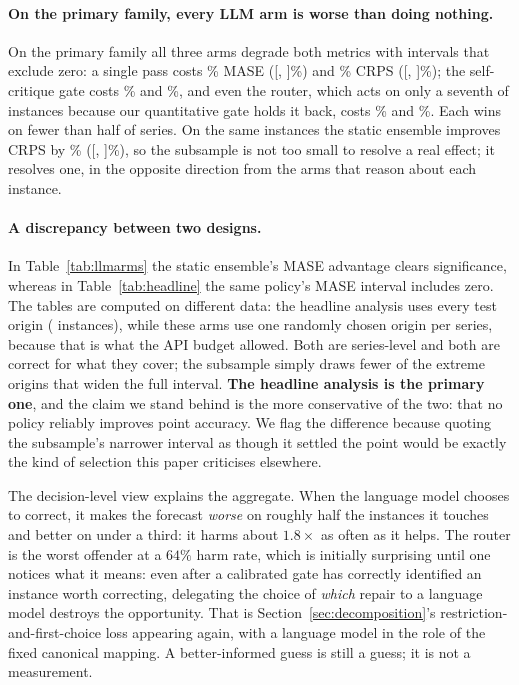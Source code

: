 \paragraph{On the primary family, every LLM arm is worse than doing nothing.}
On the primary family all
three arms degrade both metrics with intervals that exclude zero: a single pass costs
\llmMaseLlmSinglePct\% MASE ([\llmMaseLlmSingleCIlo, \llmMaseLlmSingleCIhi]\%) and
\llmCrpsLlmSinglePct\% CRPS ([\llmCrpsLlmSingleCIlo, \llmCrpsLlmSingleCIhi]\%); the
self-critique gate costs \llmMaseLlmCritiqueGatePct\% and
\llmCrpsLlmCritiqueGatePct\%, and even the router, which acts on only a seventh of
instances because our quantitative gate holds it back, costs
\llmMaseRgcLlmRouterPct\% and \llmCrpsRgcLlmRouterPct\%. Each wins on fewer than half of
series. On the same instances the static ensemble improves CRPS by
\llmCrpsAlwaysEnsembleAbs\% ([\llmCrpsAlwaysEnsembleAbsCIlo,
\llmCrpsAlwaysEnsembleAbsCIhi]\%), so the subsample is not too small to resolve a real
effect; it resolves one, in the opposite direction from the arms that reason about each
instance.

\paragraph{A discrepancy between two designs.}
In Table~\ref{tab:llmarms} the static ensemble's MASE advantage clears significance,
whereas in Table~\ref{tab:headline} the same policy's MASE interval includes zero. The
tables are computed on different data: the headline analysis uses every test origin
(\ntestinstances{} instances), while these arms use one randomly chosen origin per series,
because that is what the API budget allowed. Both are series-level and both are correct
for what they cover; the subsample simply draws fewer of the extreme origins that widen
the full interval. \textbf{The headline analysis is the primary one}, and the claim we
stand behind is the more conservative of the two: that no policy reliably improves
point accuracy. We flag the difference because quoting the subsample's narrower interval
as though it settled the point would be exactly the kind of selection this paper
criticises elsewhere.

The decision-level view explains the aggregate. When the language model chooses to
correct, it makes the forecast \emph{worse} on roughly half the instances it touches and
better on under a third: it harms about $1.8\times$ as often as it helps. The router
is the worst offender at a $64\%$ harm rate, which is initially surprising until one
notices what it means: even after a calibrated gate has correctly identified an instance
worth correcting, delegating the choice of \emph{which} repair to a language model
destroys the opportunity. That is Section~\ref{sec:decomposition}'s restriction-and-first-choice
loss appearing again, with a language model in the role of the fixed canonical mapping.
A better-informed guess is still a guess; it is not a measurement.

